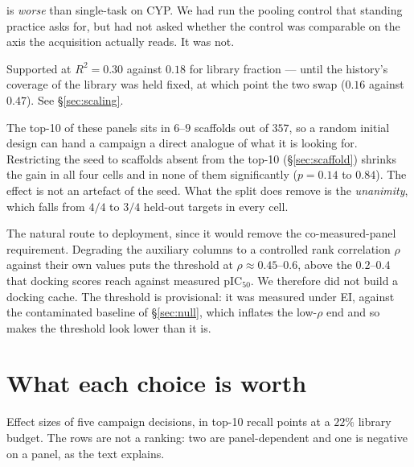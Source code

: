 \documentclass[11pt]{article}
\begin{document}
\begin{description}[leftmargin=2em,style=nextline,itemsep=0.35em]
    is \emph{worse} than single-task on CYP. We had run the pooling control that
    standing practice asks for, but had not asked whether the control was
    comparable on the axis the acquisition actually reads. It was not.
  \item[Absolute assay count should govern the operating window.]
    Supported at $R^2 = 0.30$ against $0.18$ for library fraction --- until the
    history's coverage of the library was held fixed, at which point the two
    swap ($0.16$ against $0.47$). See \S\ref{sec:scaling}.
  \item[The gain should come from seeding the campaign near the answer.]
    The top-10 of these panels sits in $6$--$9$ scaffolds out of $357$, so a
    random initial design can hand a campaign a direct analogue of what it is
    looking for. Restricting the seed to scaffolds absent from the top-10
    (\S\ref{sec:scaffold}) shrinks the gain in all four cells and in none of
    them significantly ($p = 0.14$ to $0.84$). The effect is not an artefact of
    the seed. What the split does remove is the \emph{unanimity}, which falls
    from $4/4$ to $3/4$ held-out targets in every cell.
  \item[A computed auxiliary should substitute for a measured panel.]
    The natural route to deployment, since it would remove the
    co-measured-panel requirement. Degrading the auxiliary columns to a
    controlled rank correlation $\rho$ against their own values puts the threshold at
    $\rho \approx 0.45$--$0.6$, above the $0.2$--$0.4$ that docking scores reach
    against measured pIC$_{50}$. We therefore did not build a docking cache.
    The threshold is provisional: it was measured under EI, against the
    contaminated baseline of \S\ref{sec:null}, which inflates the low-$\rho$ end
    and so makes the threshold look lower than it is.
\end{description}

\section{What each choice is worth}
\label{sec:worth}

Effect sizes of five campaign decisions, in top-10 recall points at a $22\%$
library budget. The rows are not a ranking: two are panel-dependent and one is
negative on a panel, as the text explains.
\end{document}
